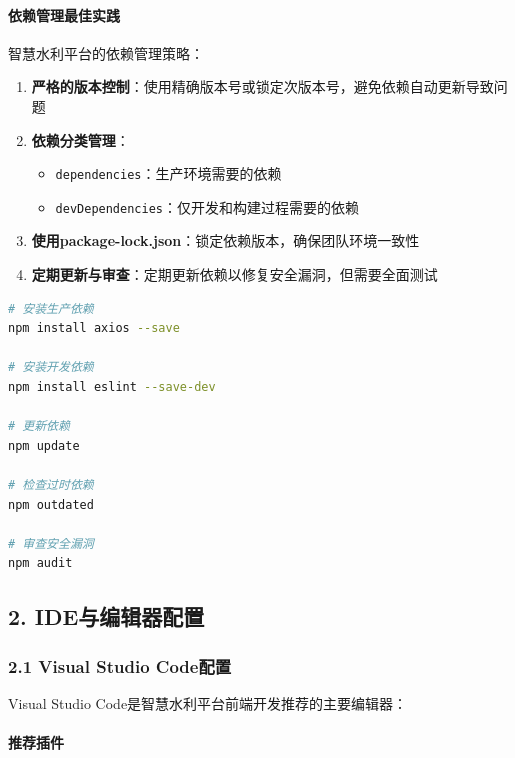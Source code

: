 \paragraph{依赖管理最佳实践}\label{ux4f9dux8d56ux7ba1ux7406ux6700ux4f73ux5b9eux8df5}

智慧水利平台的依赖管理策略：

\begin{enumerate}
\def\labelenumi{\arabic{enumi}.}
\tightlist
\item
  \textbf{严格的版本控制}：使用精确版本号或锁定次版本号，避免依赖自动更新导致问题
\item
  \textbf{依赖分类管理}：

  \begin{itemize}
  \tightlist
  \item
    \passthrough{\lstinline!dependencies!}：生产环境需要的依赖
  \item
    \passthrough{\lstinline!devDependencies!}：仅开发和构建过程需要的依赖
  \end{itemize}
\item
  \textbf{使用package-lock.json}：锁定依赖版本，确保团队环境一致性
\item
  \textbf{定期更新与审查}：定期更新依赖以修复安全漏洞，但需要全面测试
\end{enumerate}

\begin{lstlisting}[language=bash]
# 安装生产依赖
npm install axios --save

# 安装开发依赖
npm install eslint --save-dev

# 更新依赖
npm update

# 检查过时依赖
npm outdated

# 审查安全漏洞
npm audit
\end{lstlisting}

\subsection{2.
IDE与编辑器配置}\label{ideux4e0eux7f16ux8f91ux5668ux914dux7f6e}

\subsubsection{2.1 Visual Studio
Code配置}\label{visual-studio-codeux914dux7f6e}

Visual Studio Code是智慧水利平台前端开发推荐的主要编辑器：

\paragraph{推荐插件}\label{ux63a8ux8350ux63d2ux4ef6}

